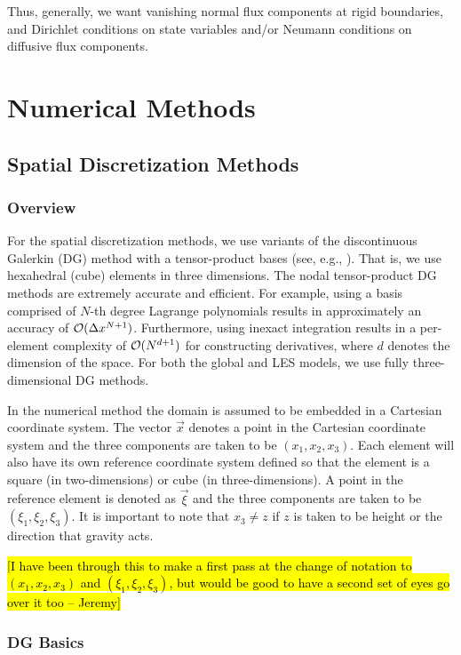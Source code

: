 \documentclass{article}
\begin{document}
Thus, generally, we want vanishing normal flux components at rigid boundaries, and Dirichlet conditions on state variables and/or Neumann conditions on diffusive flux components.

\section{Numerical Methods}
\label{sec:numerical_methods}

\subsection{Spatial Discretization Methods}

\subsubsection{Overview}
For the spatial discretization methods, we use variants of the discontinuous Galerkin (DG) method with a tensor-product bases (see, e.g., \citealt{giraldo:2008a, abdi:2016}). That is, we use hexahedral (cube) elements in three dimensions.  The nodal tensor-product DG methods are extremely accurate and efficient.  For example, using a basis comprised of $N$-th degree Lagrange polynomials results in approximately an accuracy of $\mathcal{O}(\Delta x^{N+1})$. Furthermore, using inexact integration results in a per-element complexity of $\mathcal{O}(N^{d+1})$ for constructing derivatives, where $d$ denotes the dimension of the space. For both the global and LES models, we use fully three-dimensional DG methods.

In the numerical method the domain is assumed to be embedded in a Cartesian
coordinate system. The vector $\vec{x}$ denotes a point in the Cartesian
coordinate system and the three components are taken to be $(x_{1}, x_{2},
x_{3})$. Each element will also have its own reference coordinate system defined
so that the element is a square (in two-dimensions) or cube (in
three-dimensions). A point in the reference element is denoted as $\vec{\xi}$
and the three components are taken to be $(\xi_{1}, \xi_{2}, \xi_{3})$.
It is important to note that $x_{3} \ne z$ if $z$ is taken to be height or the
direction that gravity acts.

\hl{[I have been through this to make a first pass at the change of notation to
$(x_{1}, x_{2}, x_{3})$ and $(\xi_{1}, \xi_{2}, \xi_{3})$, but would be good to
have a second set of eyes go over it too -- Jeremy]}


\subsubsection{DG Basics}
\end{document}
